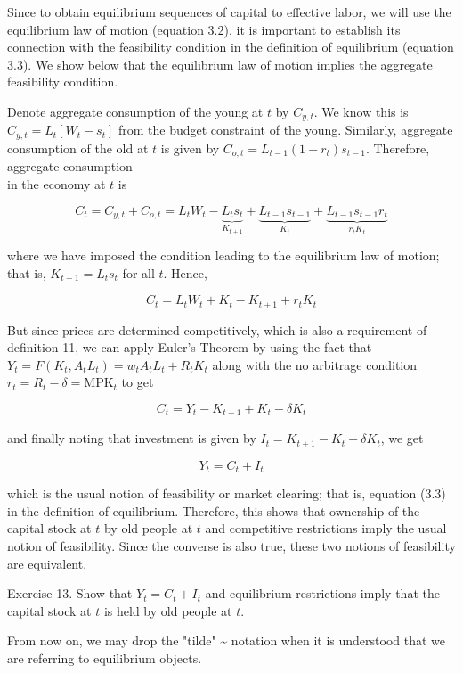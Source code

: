 \documentclass[10pt]{article}
\begin{document}
Since to obtain equilibrium sequences of capital to effective labor, we will use the equilibrium law of motion (equation 3.2), it is important to establish its connection with the feasibility condition in the definition of equilibrium (equation 3.3). We show below that the equilibrium law of motion implies the aggregate feasibility condition.

Denote aggregate consumption of the young at $t$ by $C_{y, t}$. We know this is $C_{y, t}= L_{t}\left[W_{t}-s_{t}\right]$ from the budget constraint of the young. Similarly, aggregate consumption of the old at $t$ is given by $C_{o, t}=L_{t-1}\left(1+r_{t}\right) s_{t-1}$. Therefore, aggregate consumption\\
in the economy at $t$ is

$$
C_{t}=C_{y, t}+C_{o, t}=L_{t} W_{t}-\underbrace{L_{t} s_{t}}_{K_{t+1}}+\underbrace{L_{t-1} s_{t-1}}_{K_{t}}+\underbrace{L_{t-1} s_{t-1} r_{t}}_{r_{t} K_{t}}
$$

where we have imposed the condition leading to the equilibrium law of motion; that is, $K_{t+1}=L_{t} s_{t}$ for all $t$. Hence,

$$
C_{t}=L_{t} W_{t}+K_{t}-K_{t+1}+r_{t} K_{t}
$$

But since prices are determined competitively, which is also a requirement of definition 11, we can apply Euler's Theorem by using the fact that $Y_{t}=F\left(K_{t}, A_{t} L_{t}\right)=w_{t} A_{t} L_{t}+ R_{t} K_{t}$ along with the no arbitrage condition $r_{t}=R_{t}-\delta=\mathrm{MPK}_{t}$ to get

$$
C_{t}=Y_{t}-K_{t+1}+K_{t}-\delta K_{t}
$$

and finally noting that investment is given by $I_{t}=K_{t+1}-K_{t}+\delta K_{t}$, we get

$$
Y_{t}=C_{t}+I_{t}
$$

which is the usual notion of feasibility or market clearing; that is, equation (3.3) in the definition of equilibrium. Therefore, this shows that ownership of the capital stock at $t$ by old people at $t$ and competitive restrictions imply the usual notion of feasibility. Since the converse is also true, these two notions of feasibility are equivalent.

Exercise 13. Show that $Y_{t}=C_{t}+I_{t}$ and equilibrium restrictions imply that the capital stock at $t$ is held by old people at $t$.

From now on, we may drop the "tilde" \~{} notation when it is understood that we are referring to equilibrium objects.
\end{document}
